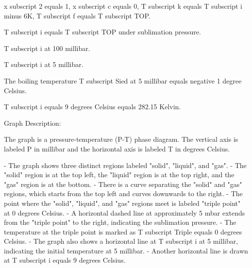 x subscript 2 equals 1, x subscript c equals 0, T subscript k equals T subscript i minus 6K, T subscript f equals T subscript TOP.

T subscript i equals T subscript TOP under sublimation pressure.

T subscript i at 100 millibar.

T subscript i at 5 millibar.

The boiling temperature T subscript Sied at 5 millibar equals negative 1 degree Celsius.

T subscript i equals 9 degrees Celsius equals 282.15 Kelvin.

Graph Description:

The graph is a pressure-temperature (P-T) phase diagram. The vertical axis is labeled P in millibar and the horizontal axis is labeled T in degrees Celsius.

- The graph shows three distinct regions labeled "solid", "liquid", and "gas".
- The "solid" region is at the top left, the "liquid" region is at the top right, and the "gas" region is at the bottom.
- There is a curve separating the "solid" and "gas" regions, which starts from the top left and curves downwards to the right.
- The point where the "solid", "liquid", and "gas" regions meet is labeled "triple point" at 0 degrees Celsius.
- A horizontal dashed line at approximately 5 mbar extends from the "triple point" to the right, indicating the sublimation pressure.
- The temperature at the triple point is marked as T subscript Triple equals 0 degrees Celsius.
- The graph also shows a horizontal line at T subscript i at 5 millibar, indicating the initial temperature at 5 millibar.
- Another horizontal line is drawn at T subscript i equals 9 degrees Celsius.